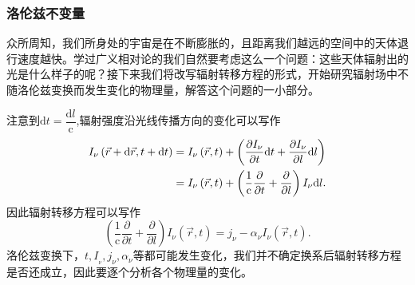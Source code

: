\documentclass[../天体物理基础.tex]{subfiles}
\begin{document}
\subsubsection{洛伦兹不变量}
众所周知，我们所身处的宇宙是在不断膨胀的，且距离我们越远的空间中的天体退行速度越快。学过广义相对论的我们自然要考虑这么一个问题：这些天体辐射出的光是什么样子的呢？接下来我们将改写辐射转移方程的形式，开始研究辐射场中不随洛伦兹变换而发生变化的物理量，解答这个问题的一小部分。

注意到$\mathrm{d}t=\dfrac{\mathrm{d}l}{\mathrm{c}}$,辐射强度沿光线传播方向的变化可以写作
\begin{align}
I_{\nu}\left(\vec{r}+\mathrm{d}\vec{r},t+\mathrm{d}t\right)&=I_\nu\left(\vec r,t\right)+\left(\frac{\partial I_\nu}{\partial t}\mathrm{d}t+\frac{\partial I_\nu}{\partial l}\mathrm{d}l\right)\notag\\
&=I_\nu\left(\vec r,t\right)+\left(\frac{1}{\mathrm{c}}\frac{\partial}{\partial t}+\frac{\partial}{\partial l}\right)I_\nu \mathrm{d}l.
\end{align}
因此辐射转移方程可以写作
\begin{equation}
\left(\frac{1}{\mathrm{c}}\frac{\partial}{\partial t}+\frac{\partial}{\partial l}\right)I_\nu\left(\vec r,t\right)=j_\nu-\alpha_\nu I_\nu\left(\vec{r},t\right).\label{1.1.51}
\end{equation}
洛伦兹变换下，$t,I_{_{\nu}},j_{\nu},\alpha_{\nu}$等都可能发生变化，我们并不确定换系后辐射转移方程是否还成立，因此要逐个分析各个物理量的变化。
\end{document}
